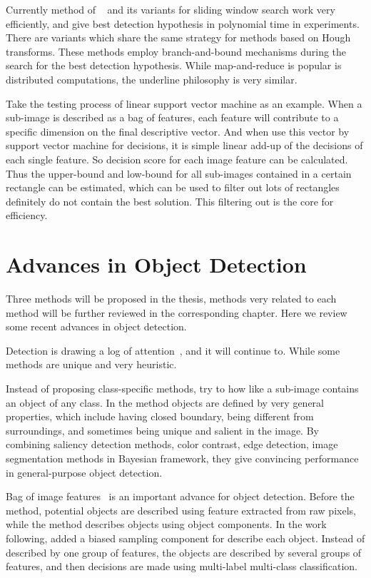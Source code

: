 Currently method of ~\cite{ij15} and its variants\cite{drl1} for sliding window search work very efficiently, and give best detection hypothesis in polynomial time in experiments. There are variants\cite{ac27} which share the same strategy for methods based on Hough transforms. These methods employ branch-and-bound mechanisms during the search for the best detection hypothesis. While map-and-reduce is popular is distributed computations, the underline philosophy is very similar.

Take the testing process of linear support vector machine as an example. When a sub-image is described as a bag of features, each feature will contribute to a specific dimension on the final descriptive vector.
And when use this vector by support vector machine for decisions, it is simple linear add-up of the decisions of each single feature. So decision score for each image feature can be calculated. Thus the upper-bound and low-bound for all sub-images contained in a certain rectangle can be estimated, which can be used to filter out lots of rectangles definitely do not contain the best solution. This filtering out is the core for efficiency.

\section{Advances in Object Detection}

Three methods will be proposed in the thesis, methods very related to each method will be further reviewed in the corresponding chapter. Here we review some recent advances in object detection.

Detection is drawing a log of attention~\cite{ij4,ac31,ac30,ac4,ac32,ac29,ac28,ac1,ac9,ac2,ac3,ac22,lb1,ac5,ac10,ac21,ac18}, and it will continue to. While some methods are unique and very heuristic.

Instead of proposing class-specific methods, \cite{wiao} try to how like a sub-image contains an object of any class. In the method objects are defined by very general properties, which include having closed boundary, being different from surroundings, and sometimes being unique and salient in the image. By combining saliency detection methods, color contrast, edge detection, image segmentation methods in Bayesian framework, they give convincing performance in general-purpose object detection.

Bag of image features~\cite{bgf} is an important advance for object detection. Before the method, potential objects are described using feature extracted from raw pixels, while the method describes objects using object components. In the work following, \cite{ij13} added a biased sampling component for describe each object. Instead of described by one group of features, the objects are described by several groups of features, and then decisions are made using multi-label multi-class classification.

